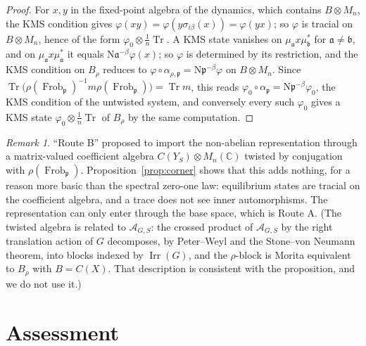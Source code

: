 \documentclass[11pt]{amsart}
\numberwithin{equation}{section}
\theoremstyle{definition}
\theoremstyle{remark}
\newtheorem{remark}[theorem]{Remark}
\newcommand{\C}{\mathbb{C}}
\newcommand{\cA}{\mathcal{A}}
\newcommand{\pp}{\mathfrak{p}}
\newcommand{\aaa}{\mathfrak{a}}
\newcommand{\bb}{\mathfrak{b}}
\newcommand{\Ns}{\mathrm{N}}
\newcommand{\Frob}{\operatorname{Frob}}
\newcommand{\Irr}{\operatorname{Irr}}
\newcommand{\Tr}{\operatorname{Tr}}
\begin{document}
\begin{proof}
For $x,y$ in the fixed-point algebra of the dynamics, which contains $B\otimes M_n$, the KMS
condition gives $\varphi(xy)=\varphi(y\sigma_{i\beta}(x))=\varphi(yx)$; so $\varphi$ is
tracial on $B\otimes M_n$, hence of the form $\varphi_0\otimes\frac1n\Tr$. A KMS state
vanishes on $\mu_\aaa x\mu_\bb^*$ for $\aaa\ne\bb$, and on $\mu_\aaa x\mu_\aaa^*$ it
equals $\Ns\aaa^{-\beta}\varphi(x)$; so $\varphi$ is determined by its restriction, and
the KMS condition on $B_\rho$ reduces to $\varphi\circ\alpha_{\rho,\pp}=\Ns\pp^{-\beta}\varphi$
on $B\otimes M_n$. Since $\Tr\bigl(\rho(\Frob_\pp)^{-1}m\rho(\Frob_\pp)\bigr)=\Tr m$, this
reads $\varphi_0\circ\alpha_\pp=\Ns\pp^{-\beta}\varphi_0$, the KMS condition of the untwisted
system, and conversely every such $\varphi_0$ gives a KMS state $\varphi_0\otimes\frac1n\Tr$
of $B_\rho$ by the same computation.
\end{proof}

\begin{remark}\label{rem:routeB}
``Route B'' proposed to import the non-abelian representation through a matrix-valued
coefficient algebra $C(Y_S)\otimes M_n(\C)$ twisted by conjugation with $\rho(\Frob_\pp)$.
Proposition~\ref{prop:corner} shows that this adds nothing, for a reason more basic than
the spectral zero-one law: equilibrium states are tracial on the coefficient algebra, and
a trace does not see inner automorphisms. The representation can only enter through the
base space, which is Route A. (The twisted algebra is related to $\cA_{G,S}$: the crossed
product of $\cA_{G,S}$ by the right translation action of $G$ decomposes, by Peter--Weyl
and the Stone--von Neumann theorem, into blocks indexed by $\Irr(G)$, and the $\rho$-block
is Morita equivalent to $B_\rho$ with $B=C(X)$. That description is consistent with the
proposition, and we do not use it.)
\end{remark}

\section{Assessment}
\end{document}
